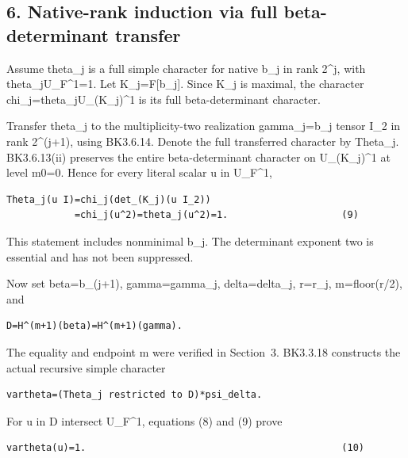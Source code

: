 \hypertarget{dyadic_character-native-rank-induction-via-full-beta-determinant-transfer}{%
\subsection{6. Native-rank induction via full beta-determinant
transfer}\label{dyadic_character-native-rank-induction-via-full-beta-determinant-transfer}}

Assume theta\_j is a full simple character for native b\_j in rank
2\^{}j, with theta\_j\textbar U\_F\^{}1=1. Let K\_j=F{[}b\_j{]}. Since
K\_j is maximal, the character chi\_j=theta\_j\textbar U\_(K\_j)\^{}1 is
its full beta-determinant character.

Transfer theta\_j to the multiplicity-two realization gamma\_j=b\_j
tensor I\_2 in rank 2\^{}(j+1), using BK3.6.14. Denote the full
transferred character by Theta\_j. BK3.6.13(ii) preserves the entire
beta-determinant character on U\_(K\_j)\^{}1 at level m0=0. Hence for
every literal scalar u in U\_F\^{}1,

\begin{Verbatim}[fontsize=\small,breaklines=true,breakanywhere=true]
Theta_j(u I)=chi_j(det_(K_j)(u I_2))
            =chi_j(u^2)=theta_j(u^2)=1.                    (9)
\end{Verbatim}

This statement includes nonminimal b\_j. The determinant exponent two is
essential and has not been suppressed.

Now set beta=b\_(j+1), gamma=gamma\_j, delta=delta\_j, r=r\_j,
m=floor(r/2), and

\begin{Verbatim}[fontsize=\small,breaklines=true,breakanywhere=true]
D=H^(m+1)(beta)=H^(m+1)(gamma).
\end{Verbatim}

The equality and endpoint m were verified in Section~3. BK3.3.18
constructs the actual recursive simple character

\begin{Verbatim}[fontsize=\small,breaklines=true,breakanywhere=true]
vartheta=(Theta_j restricted to D)*psi_delta.
\end{Verbatim}

For u in D intersect U\_F\^{}1, equations (8) and (9) prove

\begin{Verbatim}[fontsize=\small,breaklines=true,breakanywhere=true]
vartheta(u)=1.                                             (10)
\end{Verbatim}

